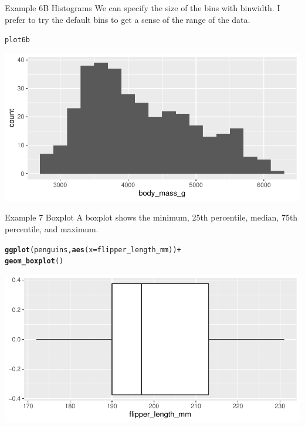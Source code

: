 \documentclass{beamer}\usepackage[]{graphicx}\usepackage[]{xcolor}
\makeatletter
\newcommand{\hlopt}[1]{\textcolor[rgb]{0,0,0}{#1}}%
\newcommand{\hlstd}[1]{\textcolor[rgb]{0.345,0.345,0.345}{#1}}%
\newcommand{\hlkwc}[1]{\textcolor[rgb]{0.333,0.667,0.333}{#1}}%
\newcommand{\hlkwd}[1]{\textcolor[rgb]{0.737,0.353,0.396}{\textbf{#1}}}%
\newenvironment{kframe}{%
 \def\at@end@of@kframe{}%
 \ifinner\ifhmode%
  \def\at@end@of@kframe{\end{minipage}}%
  \begin{minipage}{\columnwidth}%
 \fi\fi%
 \def\FrameCommand##1{\hskip\@totalleftmargin \hskip-\fboxsep
 \colorbox{shadecolor}{##1}\hskip-\fboxsep
     \hskip-\linewidth \hskip-\@totalleftmargin \hskip\columnwidth}%
 \MakeFramed {\advance\hsize-\width
   \@totalleftmargin\z@ \linewidth\hsize
   \@setminipage}}%
 {\par\unskip\endMakeFramed%
 \at@end@of@kframe}
\newenvironment{knitrout}{}{} %
\makeatother
\begin{document}
\begin{frame}[fragile]{Example 6B Histograms}
We can specify the size of the bins with binwidth. I prefer to try the default bins to get a sense of the range of the data.
\begin{knitrout}
\color{fgcolor}\begin{kframe}
\begin{alltt}
\hlstd{plot6b}
\end{alltt}
\end{kframe}
\includegraphics[width=0.95\linewidth]{figure/unnamed-chunk-32-1} 
\end{knitrout}


\end{frame}
\begin{frame}[fragile]{Example 7 Boxplot}
A boxplot shows the minimum, 25th percentile, median, 75th percentile, and maximum.
\begin{knitrout}
\color{fgcolor}\begin{kframe}
\begin{alltt}
\hlkwd{ggplot}\hlstd{(penguins,} \hlkwd{aes}\hlstd{(}\hlkwc{x} \hlstd{= flipper_length_mm))} \hlopt{+}
    \hlkwd{geom_boxplot}\hlstd{()}
\end{alltt}
\end{kframe}
\includegraphics[width=0.95\linewidth]{figure/unnamed-chunk-33-1} 
\end{knitrout}

\end{frame}
\end{document}
